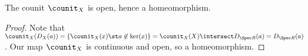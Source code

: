 \begin{lemma}
The counit $\counit_X$ is open, hence a homeomorphism.
\end{lemma}
\begin{proof}
Note that 
$\counit_X(D_X(a))= \{\counit_X(x) \st a\not\in \ker(x)\} = \counit_X(X) \intersect D_{\Spec R}(a) = D_{\Spec R}(a)$.
Our map $\counit_X$ is continuous and open, so a homeomorphism.
\end{proof}